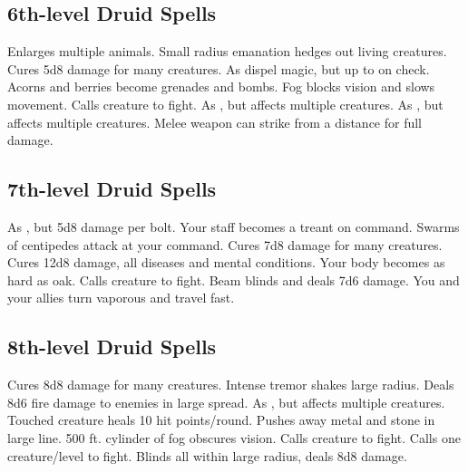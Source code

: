 \subsection{6th-level Druid Spells}
\begin{spelllist}
 Enlarges multiple animals.
 Small radius emanation hedges out living creatures.
 Cures 5d8 damage for many creatures.
 As dispel magic, but up to  on check.
 Acorns and berries become grenades and bombs.
 Fog blocks vision and slows movement.
 Calls creature to fight.
 As , but affects multiple creatures.
 As , but affects multiple creatures.
 Melee weapon can strike from a distance for full damage.
\end{spelllist}

\subsection{7th-level Druid Spells}
\begin{spelllist}
 As , but 5d8 damage per bolt.
 Your staff becomes a treant on command.
 Swarms of centipedes attack at your command.
 Cures 7d8 damage for many creatures.
 Cures 12d8 damage, all diseases and mental conditions.
 Your body becomes as hard as oak. 
 Calls creature to fight.
 Beam blinds and deals 7d6 damage.
 You and your allies turn vaporous and travel fast.
\end{spelllist}

\subsection{8th-level Druid Spells}
\begin{spelllist}
 Cures 8d8 damage for many creatures.
 Intense tremor shakes large radius.
 Deals 8d6 fire damage to enemies in large spread.
 As , but affects multiple creatures.
 Touched creature heals 10 hit points/round.
 Pushes away metal and stone in large line.
 500 ft. cylinder of fog obscures vision.
 Calls creature to fight.
 Calls one creature/level to fight.
 Blinds all within large radius, deals 8d8 damage.
\end{spelllist}

